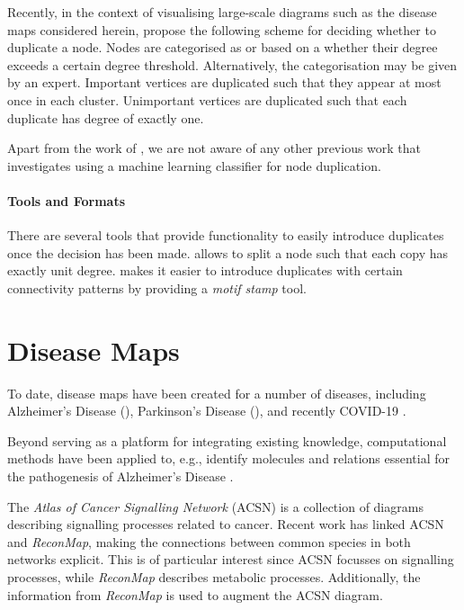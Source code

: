 \documentclass[
	fontsize=10pt, %
	twoside=false, %
	secnumdepth=1, %
  toc=indentunnumbered %
]{kaobook}
\begin{document}
Recently, in the context of visualising large-scale diagrams such as the disease
maps considered herein, \citeauthor{wu_MultilevelAreaBalancing_2020} propose the
following scheme for deciding whether to duplicate a node. Nodes are categorised
as  or  based on a whether their degree exceeds
a certain degree threshold. Alternatively, the categorisation may be given by an expert.
% 
Important vertices are duplicated such that they appear at most once in each
cluster. Unimportant vertices are duplicated such that each duplicate has degree
of exactly one.
%

Apart from the work of \citeauthor{nielsen_MachineLearningSupport_2019}, we are
not aware of any other previous work that investigates using a machine learning
classifier for node duplication.


\paragraph{Tools and Formats}
There are several tools that provide functionality to easily introduce
duplicates once the decision has been made. 
\cite{villeger_ArcadiaVisualizationTool_2010} allows to split a node such that
each copy has exactly unit degree. 
\cite{droste_OmixVisualizationTool_2013} makes it easier to introduce duplicates
with certain connectivity patterns by providing a \textit{motif stamp} tool.
%


\section{Disease Maps}
To date, disease maps have been created for a number of diseases, including
Alzheimer's Disease (\alzpathway \cite{ogishima_AlzPathwayUpdatedMap_2016}),
Parkinson's Disease (\pdmap \cite{fujita_IntegratingPathwaysParkinson_2014}),
and recently \textsc{COVID-19}
\cite{ostaszewski_COVID19DiseaseMap_2020}.

Beyond serving as a platform for
integrating existing knowledge, computational methods have been applied to,
e.g., identify molecules and relations essential for the pathogenesis of Alzheimer's
Disease \cite{mizuno_NetworkAnalysisComprehensive_2016}.

The \textit{Atlas of Cancer Signalling Network} (ACSN)
\cite{kuperstein_AtlasCancerSignalling_2015} is a collection of diagrams
describing signalling processes related to cancer. Recent work
\cite{sompairac_metabolic_2019} has linked ACSN and \textit{ReconMap}, making
the connections between common species in both networks explicit. This is of
particular interest since ACSN focusses on signalling processes, while
\textit{ReconMap} describes metabolic processes.
Additionally, the information from \textit{ReconMap} is used to augment the ACSN diagram.
\end{document}
